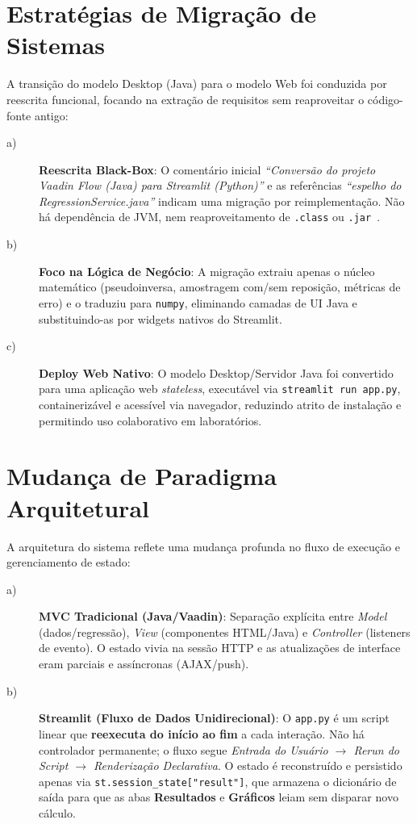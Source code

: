 \section{Estratégias de Migração de Sistemas}
A transição do modelo Desktop (Java) para o modelo Web foi conduzida por reescrita funcional, focando na extração de requisitos sem reaproveitar o código-fonte antigo:
\begin{description}
\item[a)] \textbf{Reescrita Black-Box}: O comentário inicial \textit{``Conversão do projeto Vaadin Flow (Java) para Streamlit (Python)''} e as referências \textit{``espelho do RegressionService.java''} indicam uma migração por reimplementação. Não há dependência de JVM, nem reaproveitamento de \verb|.class| ou \verb|.jar|~\cite{becker2020}.
\item[b)] \textbf{Foco na Lógica de Negócio}: A migração extraiu apenas o núcleo matemático (pseudoinversa, amostragem com/sem reposição, métricas de erro) e o traduziu para \verb|numpy|, eliminando camadas de UI Java e substituindo-as por widgets nativos do Streamlit.
\item[c)] \textbf{Deploy Web Nativo}: O modelo Desktop/Servidor Java foi convertido para uma aplicação web \textit{stateless}, executável via \texttt{streamlit run app.py}, containerizável e acessível via navegador, reduzindo atrito de instalação e permitindo uso colaborativo em laboratórios.
\end{description}

\section{Mudança de Paradigma Arquitetural}
A arquitetura do sistema reflete uma mudança profunda no fluxo de execução e gerenciamento de estado:
\begin{description}
\item[a)] \textbf{MVC Tradicional (Java/Vaadin)}: Separação explícita entre \textit{Model} (dados/regressão), \textit{View} (componentes HTML/Java) e \textit{Controller} (listeners de evento). O estado vivia na sessão HTTP e as atualizações de interface eram parciais e assíncronas (AJAX/push).
\item[b)] \textbf{Streamlit (Fluxo de Dados Unidirecional)}: O \verb|app.py| é um script linear que \textbf{reexecuta do início ao fim} a cada interação. Não há controlador permanente; o fluxo segue \textit{Entrada do Usuário $\rightarrow$ Rerun do Script $\rightarrow$ Renderização Declarativa}. O estado é reconstruído e persistido apenas via \verb|st.session_state["result"]|, que armazena o dicionário de saída para que as abas \textbf{Resultados} e \textbf{Gráficos} leiam sem disparar novo cálculo.
\end{description}

